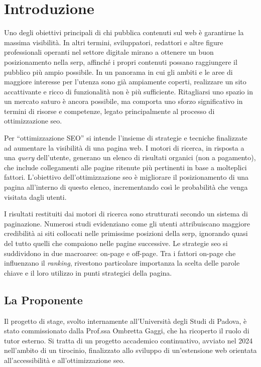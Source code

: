 \chapter{Introduzione}
\label{cap:introduzione}

Uno degli obiettivi principali di chi pubblica contenuti sul web è garantirne la massima visibilità. In altri termini, sviluppatori, redattori e altre figure professionali operanti nel settore digitale mirano a ottenere un buon posizionamento nella \gls{serp}, affinché i propri contenuti possano raggiungere il pubblico più ampio possibile. In un panorama in cui gli ambiti e le aree di maggiore interesse per l’utenza sono già ampiamente coperti, realizzare un sito accattivante e ricco di funzionalità non è più sufficiente. Ritagliarsi uno spazio in un mercato saturo è ancora possibile, ma comporta uno sforzo significativo in termini di risorse e competenze, legato principalmente al processo di ottimizzazione \gls{seo}.

\vspace{10pt}
\noindent Per “ottimizzazione SEO” si intende l’insieme di strategie e tecniche finalizzate ad aumentare la visibilità di una pagina web. I motori di ricerca, in risposta a una \textit{query} dell’utente, generano un elenco di risultati organici (non a pagamento), che include collegamenti alle pagine ritenute più pertinenti in base a molteplici fattori. L’obiettivo dell’ottimizzazione \gls{seo} è migliorare il posizionamento di una pagina all’interno di questo elenco, incrementando così le probabilità che venga visitata dagli utenti.

\vspace{10pt}
\noindent I risultati restituiti dai motori di ricerca sono strutturati secondo un sistema di paginazione. Numerosi studi evidenziano come gli utenti attribuiscano maggiore credibilità ai siti collocati nelle primissime posizioni della \gls{serp}, ignorando quasi del tutto quelli che compaiono nelle pagine successive. Le strategie \gls{seo} si suddividono in due macroaree: \gls{on-page} e \gls{off-page}. Tra i fattori \gls{on-page} che influenzano il \textit{ranking}, rivestono particolare importanza la scelta delle parole chiave e il loro utilizzo in punti strategici della pagina.

\section{La Proponente}

Il progetto di stage, svolto internamente all’Università degli Studi di Padova, è stato commissionato dalla Prof.ssa Ombretta Gaggi, che ha ricoperto il ruolo di tutor esterno. Si tratta di un progetto accademico continuativo, avviato nel 2024 nell’ambito di un tirocinio, finalizzato allo sviluppo di un’estensione web orientata all’accessibilità e all’ottimizzazione \gls{seo}.

